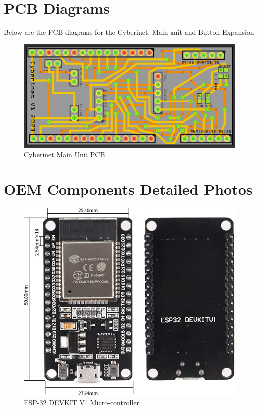\section{PCB Diagrams}
Below are the PCB diagrams for the Cyberinet. Main unit and Button Expansion


\begin{center}
\begin{figure}
    \centering
    \includegraphics[scale=0.3]{diagrams/PCBs/mainBoard.png}
    \caption{Cyberinet Main Unit PCB}
    \label{fig:mainPCB}
\end{figure}
\end{center}



\section{OEM Components Detailed Photos}

\begin{center}
    \begin{figure}
        \centering
        \includegraphics[scale=0.3]{diagrams/oem/esp-32.jpg}
        \caption{ESP-32 DEVKIT V1 Micro-controller}
        \label{fig:ESP-32}
    \end{figure}
\end{center}

